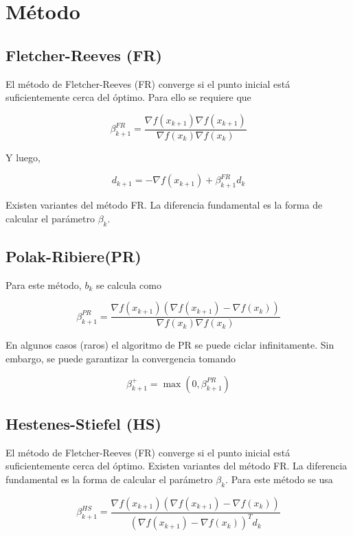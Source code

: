 \documentclass[11pt,letterpaper]{article}
\theoremstyle{definition}
\theoremstyle{definition}
\theoremstyle{definition}
\begin{document}
\section{Método}
\subsection{Fletcher-Reeves (FR)}
El método de Fletcher-Reeves (FR) converge si el punto inicial
está suficientemente cerca del óptimo. Para ello se requiere que 
\begin{shaded*}
\begin{equation}
	\beta_{k+1}^{FR} = \dfrac{\nabla f(x_{k+1}) \nabla f(x_{k+1})}{\nabla f(x_k) \nabla f(x_k)}
\end{equation}
\end{shaded*}
Y luego,
\begin{shaded*}
	\begin{equation}
		d_{k+1} = - \nabla f(x_{k+1}) + \beta_{k+1}^{FR} d_k
	\end{equation}
\end{shaded*}
Existen variantes del
método FR. La diferencia fundamental es la forma de calcular
el parámetro $ \beta_k $.

\subsection{Polak-Ribiere(PR)}
Para este método, $ b_k $ se calcula como
\begin{shaded*}
	\begin{equation*}
		\beta_{k+1}^{PR} = \dfrac{\nabla f(x_{k+1}) (\nabla f(x_{k+1}) - \nabla f(x_k))}{\nabla f(x_k) \nabla f(x_k)}
	\end{equation*}
\end{shaded*}
En algunos casos (raros) el algoritmo de PR se puede
ciclar infinitamente. Sin embargo, se puede garantizar la
convergencia tomando
\begin{shaded*}
	\begin{equation*}
		\beta_{k+1}^{+} = \max (0, \beta_{k+1}^{PR})
	\end{equation*}
\end{shaded*}

\subsection{Hestenes-Stiefel (HS)}
El método de Fletcher-Reeves (FR) converge si el punto inicial
está suficientemente cerca del óptimo. Existen variantes del
método FR. La diferencia fundamental es la forma de calcular
el parámetro $ \beta_k $. Para este método se usa
\begin{shaded*}
	\begin{equation*}
		\beta_{k+1}^{HS} = \dfrac{\nabla f(x_{k+1}) (\nabla f(x_{k+1}) - \nabla f(x_k))}{(\nabla f(x_{k+1}) - \nabla f(x_{k}))^T d_k}
	\end{equation*}
\end{shaded*}
\end{document}
